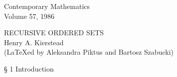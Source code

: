 \documentclass[twoside]{article}
\begin{document}
%
%
\normalsize
\thispagestyle{plain}
\addtolength{\voffset}{-1.5cm}
\begin{flushleft}
Contemporary Mathematics\\
Volume 57, 1986
\end{flushleft}
\onehalfspacing
\begin{center}
RECURSIVE ORDERED SETS\\
\vspace{1mm}
Henry A. Kierstead\\[\baselineskip]
{\small (\LaTeX ed by Aleksandra Piktus and Bartosz Szabucki)}
\end{center}
\vspace{2mm}
\onehalfspacing
\noindent \S \hspace{1pt} 1 Introduction\\
\end{document}
